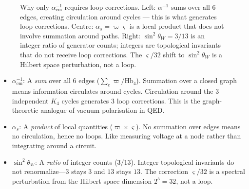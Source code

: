 \documentclass[11pt,a4paper]{article}
\theoremstyle{definition}
\newcommand{\Hbfour}{\mathrm{Hb}_4}
\newcommand{\gs}{\varsigma}
\begin{document}
\begin{figure}[h]
\caption{Why only $\alpha^{-1}_{\text{em}}$ requires loop corrections. Left: $\alpha^{-1}$ sums over all 6 edges, creating circulation around cycles --- this is what generates loop corrections. Centre: $\alpha_s = \varpi\gs$ is a local product that does not involve summation around paths. Right: $\sin^2\theta_W = 3/13$ is an integer ratio of generator counts; integers are topological invariants that do not receive loop corrections. The $\gs/32$ shift to $\sin^2\theta_W$ is a Hilbert space perturbation, not a loop.}
\label{fig:why_only_alpha}
\end{figure}

\begin{itemize}[nosep]
    \item \textbf{$\alpha^{-1}_{\text{em}}$}: A \emph{sum} over all 6 edges ($\sum_e \varpi/\Hbfour$). Summation over a closed graph means information circulates around cycles. Circulation around the 3 independent $K_4$ cycles generates 3 loop corrections. This is the graph-theoretic analogue of vacuum polarisation in QED.

    \item \textbf{$\alpha_s$}: A \emph{product} of local quantities ($\varpi \times \gs$). No summation over edges means no circulation, hence no loops. Like measuring voltage at a node rather than integrating around a circuit.

    \item \textbf{$\sin^2\theta_W$}: A \emph{ratio} of integer counts ($3/13$). Integer topological invariants do not renormalize---$3$ stays $3$ and $13$ stays $13$. The correction $\gs/32$ is a spectral perturbation from the Hilbert space dimension $2^5 = 32$, not a loop.
\end{itemize}
\end{document}
